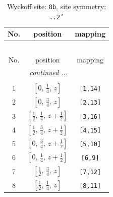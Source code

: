 \documentclass[fleqn,8pt]{jsarticle}
\begin{document}
\begin{longtable}{ccc}
\caption{Wyckoff site: {\tt 8b}, site symmetry: {\tt ..2'}}
 \\
 \hline \hline
No. & position & mapping \\ \hline \endfirsthead

\multicolumn{2}{l}{\tablename\ \thetable{}} \\
 \hline \hline
No. & position & mapping \\ \hline \endhead

 \hline \hline
\multicolumn{2}{r}{\footnotesize\it continued ...} \\ \endfoot

 \hline \hline
\multicolumn{2}{r}{} \\ \endlastfoot

1 & $\left[ 0,\, \frac{1}{4},\, z \right]$ & {\tt [1,14]} \\ \hline
2 & $\left[ 0,\, \frac{3}{4},\, z \right]$ & {\tt [2,13]} \\ \hline
3 & $\left[ \frac{1}{2},\, \frac{1}{4},\, z + \frac{1}{2} \right]$ & {\tt [3,16]} \\ \hline
4 & $\left[ \frac{1}{2},\, \frac{3}{4},\, z + \frac{1}{2} \right]$ & {\tt [4,15]} \\ \hline
5 & $\left[ 0,\, \frac{3}{4},\, z + \frac{1}{2} \right]$ & {\tt [5,10]} \\ \hline
6 & $\left[ 0,\, \frac{1}{4},\, z + \frac{1}{2} \right]$ & {\tt [6,9]} \\ \hline
7 & $\left[ \frac{1}{2},\, \frac{3}{4},\, z \right]$ & {\tt [7,12]} \\ \hline
8 & $\left[ \frac{1}{2},\, \frac{1}{4},\, z \right]$ & {\tt [8,11]} \\
\end{longtable}
\renewcommand{\arraystretch}{1.2}
\end{document}
